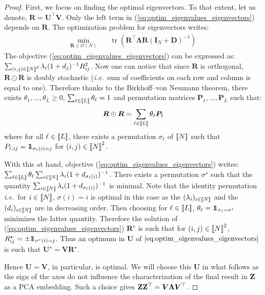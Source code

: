 \begin{proof}
First, we focus on finding the optimal eigenvectors. To that extent, let us denote, $\bm{R} = \bm{U}^\top\bm{V}$. Only the left term in (\ref{eq:optim_eigenvalues_eigenvectors}) depends on $\bm{R}$. The optimization problem for eigenvectors writes:
\begin{align}
   \min_{\bm{R} \in \mathcal{O}(N)} \quad & \operatorname{tr}\left(\bm{R}^\top \bm{\Lambda} \bm{R} (\bm{I}_N + \bm{D})^{-1} \right) \label{eq:optim_eigenvalues_eigenvectors}
\end{align}
The objective (\ref{eq:optim_eigenvalues_eigenvectors}) can be expressed as: $\sum_{(i,j) \in {[\![N]\!]}^2} \lambda_i (1 + d_j)^{-1} R_{ij}^2$. Now one can notice that since $\bm{R}$ is orthogonal, $\bm{R} \odot \bm{R}$ is doubly stochastic (\textit{i.e.}\ sum of coefficients on each row and column is equal to one). Therefore thanks to the Birkhoff–von Neumann theorem, there exists $\theta_1, ..., \theta_L \geq 0$, $\sum_{\ell \in {[\![L]\!]}} \theta_\ell = 1$ and permutation matrices $\bm{P}_1, ..., \bm{P}_L$ such that:
$$\bm{R} \odot \bm{R} = \sum_{\ell \in {[\![L]\!]}} \theta_\ell \bm{P}_\ell$$
where for all $\ell \in {[\![L]\!]}$, there exists a permutation $\sigma_\ell$ of ${[\![N]\!]}$ such that $P_{\ell,ij} = 1\!\!1_{\sigma_{\ell}(i) = j}$ for $(i,j) \in {[\![N]\!]}^2$. 

With this at hand, objective (\ref{eq:optim_eigenvalues_eigenvectors}) writes: $\sum_{\ell \in {[\![L]\!]}} \theta_\ell \sum_{i \in {[\![N]\!]}} \lambda_i (1 + d_{\sigma_\ell(i)})^{-1}$. There exists a permutation $\sigma^\star$ such that the quantity $\sum_{i \in {[\![N]\!]}} \lambda_i (1 + d_{\sigma_\ell(i)})^{-1}$ is minimal. Note that the identity permutation \textit{i.e.}\ for $i \in {[\![N]\!]}$, $ \sigma(i) = i$ is optimal in this case as the $(\lambda_i)_{i \in {[\![N]\!]}}$ and the $(d_i)_{i \in {[\![N]\!]}}$ are in decreasing order. Then choosing for $\ell \in {[\![L]\!]}$, $\theta_\ell = 1\!\!1_{\sigma_\ell = \sigma^\star}$ minimizes the latter quantity. Therefore the solution of (\ref{eq:optim_eigenvalues_eigenvectors}) $\bm{R}^{\star}$ is such that for $(i,j) \in {[\![N]\!]}^2$, $R^\star_{ij} = \pm 1\!\!1_{\sigma^\star(i)=j}$. Thus an optimum in $\bm{U}$ of $\ref{eq:optim_eigenvalues_eigenvectors}$ is such that $\bm{U}^\star = \bm{V} \bm{R}^\star$. 

Hence $\bm{U} = \bm{V}$, in particular, is optimal. We will choose this $\bm{U}$ in what follows as the sign of the axes do not influence the characterization of the final result in $\mathbf{Z}$ as a PCA embedding. Such a choice gives $\mathbf{Z} \mathbf{Z}^\top = \bm{V} \bm{\Lambda} \bm{V}^\top$. 


\end{proof}
